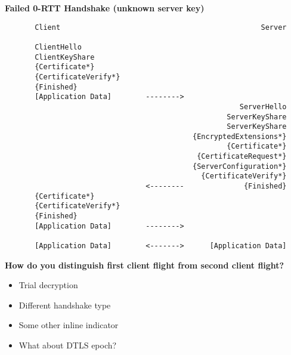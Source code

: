 \documentclass[helvetica]{seminar}
\newcommand{\heading}[1]{%
  \begin{center} 
    \large\bf 
    #1 
  \end{center} 
  \vspace{.4 in}}
\begin{document}
\begin{slide}
\heading{Failed 0-RTT Handshake (unknown server key)}

\vspace{-.5in}
{\scriptsize
\begin{verbatim}
       Client                                               Server

       ClientHello
       ClientKeyShare
       {Certificate*}
       {CertificateVerify*}
       {Finished}              
       [Application Data]        -------->
                                                       ServerHello
                                                    ServerKeyShare
                                                    ServerKeyShare
                                            {EncryptedExtensions*}
                                                    {Certificate*}
                                             {CertificateRequest*}
                                            {ServerConfiguration*}
                                              {CertificateVerify*}
                                 <--------              {Finished}
       {Certificate*}
       {CertificateVerify*}
       {Finished}              
       [Application Data]        -------->

       [Application Data]        <------->      [Application Data]
\end{verbatim}
}
\end{slide}

\begin{slide}
\heading{How do you distinguish first client flight from second client flight?}

\begin{itemize}
\item Trial decryption
\item Different handshake type
\item Some other inline indicator
\item What about DTLS epoch?
\end{itemize}
\end{slide}
\end{document}
